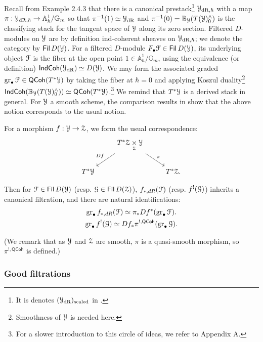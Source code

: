 \documentclass[reqno,11pt]{amsart}
\numberwithin{equation}{subsection}
\theoremstyle{remark}
\newcommand{\bA}{{\mathbb A}}
\newcommand{\bB}{{\mathbb B}}
\newcommand{\bG}{{\mathbb G}}
\newcommand{\sF}{{\EuScript F}}
\newcommand{\sG}{{\EuScript G}}
\newcommand{\sY}{{\EuScript Y}}
\newcommand{\sZ}{{\EuScript Z}}
\newcommand{\on}{\operatorname}
\newcommand{\gr}{\on{gr}}
\renewcommand{\dot}{\bullet}
\newcommand{\Fil}{\mathsf{Fil}\,}
\newcommand{\fil}{F}
\newcommand{\IndCoh}{\mathsf{IndCoh}}
\newcommand{\QCoh}{\mathsf{QCoh}}
\newcommand{\dR}{\on{dR}}
\begin{document}
Recall from \cite{gr-ii} Example 2.4.3 that there is a canonical
prestack\footnote{It is denotes $(\sY_{\dR})_{\on{scaled}}$ in 
\cite{gr-ii}.} 
$\sY_{\dR,\hbar}$ with a map $\pi:\sY_{\dR,\hbar} \to \bA_{\hbar}^1/\bG_m$
so that $\pi^{-1}(1) \simeq \sY_{\dR}$ and $\pi^{-1}(0) = \bB_{\sY}(T(\sY)_0^{\wedge})$
is the classifying stack for the tangent space of $\sY$ along its zero section.
Filtered $D$-modules on $\sY$ are by definition ind-coherent sheaves on 
$\sY_{\dR,\hbar}$; we denote the category by $\Fil D(\sY)$. 
For a filtered $D$-module 
$\fil_{\dot} \sF \in \Fil D(\sY)$, its underlying 
object $\sF$ is the fiber at the open point $1 \in \bA_{\hbar}^1/\bG_m$,
using the equivalence (or definition) $\IndCoh(\sY_{\dR}) \simeq D(\sY)$.
We may form the associated graded $\gr_{\dot} \sF \in \QCoh(T^*\sY)$
by taking the fiber at $\hbar = 0$ and applying Koszul duality\footnote{Smoothness
of $\sY$ is needed here.}
$\IndCoh(\bB_{\sY}(T(\sY)_0^{\wedge})) \simeq 
\QCoh(T^*\sY)$.\footnote{For a slower introduction to this circle of ideas, 
we refer to \cite{whit} Appendix A.} We remind that $T^*\sY$ is a derived
stack in general. For $\sY$ a smooth scheme, the comparison results
in \cite{gr-ii} show that the above notion corresponds to the usual notion.

For a morphism $f:\sY \to \sZ$, we form the usual correspondence:
%
\[
\begin{tikzcd}
& 
T^*\sZ \underset{\sZ}{\times} \sY 
\arrow[dl,"Df",swap] 
\arrow[dr,"\pi"]
\\
T^*\sY 
&&
T^*\sZ.
\end{tikzcd}
\]

\noindent Then for $\sF \in \Fil D(\sY)$ (resp. 
$\sG \in \Fil D(\sZ)$), $f_{*,dR}(\sF)$ (resp. $f^!(\sG)$)
inherits a canonical filtration, and there are natural identifications:
%
\begin{equation}\label{eq:fil-functoriality}
\begin{gathered}
\gr_{\dot} f_{*,dR}(\sF) \simeq \pi_*Df^*(\gr_{\dot} \sF). \\
\gr_{\dot} f^!(\sG) \simeq Df_*\pi^{!,\QCoh}(\gr_{\dot} \sG). \\
\end{gathered}
\end{equation}

\noindent (We remark that as $\sY$ and $\sZ$ are smooth, $\pi$ is 
a quasi-smooth morphism, so $\pi^{!,\QCoh}$ is defined.)

\subsubsection{Good filtrations}\label{sss:good-filt-constr}
\end{document}
